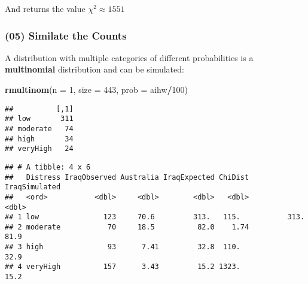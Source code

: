 \documentclass[
]{article}
\newenvironment{Shaded}{\begin{snugshade}}{\end{snugshade}}
\newcommand{\CommentTok}[1]{\textcolor[rgb]{0.56,0.35,0.01}{\textit{#1}}}
\newcommand{\DataTypeTok}[1]{\textcolor[rgb]{0.13,0.29,0.53}{#1}}
\newcommand{\DecValTok}[1]{\textcolor[rgb]{0.00,0.00,0.81}{#1}}
\newcommand{\KeywordTok}[1]{\textcolor[rgb]{0.13,0.29,0.53}{\textbf{#1}}}
\newcommand{\NormalTok}[1]{#1}
\newcommand{\OperatorTok}[1]{\textcolor[rgb]{0.81,0.36,0.00}{\textbf{#1}}}
\newcommand{\StringTok}[1]{\textcolor[rgb]{0.31,0.60,0.02}{#1}}
\begin{document}
And returns the value \(\chi^2 \approx 1551\)

\hypertarget{similate-the-counts}{%
\subsubsection{(05) Similate the Counts}\label{similate-the-counts}}

A distribution with multiple categories of different probabilities is a
\textbf{multinomial} distribution and can be simulated:

\begin{Shaded}
\begin{Highlighting}[]
\KeywordTok{rmultinom}\NormalTok{(}\DataTypeTok{n =} \DecValTok{1}\NormalTok{, }\DataTypeTok{size =} \DecValTok{443}\NormalTok{, }\DataTypeTok{prob =}\NormalTok{ aihw}\OperatorTok{/}\DecValTok{100}\NormalTok{)}
\end{Highlighting}
\end{Shaded}

\begin{verbatim}
##          [,1]
## low       311
## moderate   74
## high       34
## veryHigh   24
\end{verbatim}

\begin{Shaded}
\end{Shaded}

\begin{verbatim}
## # A tibble: 4 x 6
##   Distress IraqObserved Australia IraqExpected ChiDist IraqSimulated
##   <ord>           <dbl>     <dbl>        <dbl>   <dbl>         <dbl>
## 1 low               123     70.6         313.   115.           313. 
## 2 moderate           70     18.5          82.0    1.74          81.9
## 3 high               93      7.41         32.8  110.            32.9
## 4 veryHigh          157      3.43         15.2 1323.            15.2
\end{verbatim}
\end{document}
